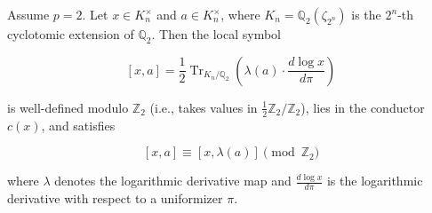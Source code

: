 Assume $p = 2$. Let $x \in K_n^{\times}$ and $a \in K_n^{\times}$, where $K_n = \mathbb{Q}_2(\zeta_{2^n})$ is the $2^n$-th cyclotomic extension of $\mathbb{Q}_2$. Then the local symbol

$$[x, a] = \frac{1}{2} \operatorname{Tr}_{K_n/\mathbb{Q}_2}\left( \lambda(a) \cdot \frac{d\log x}{d\pi} \right)$$

is well-defined modulo $\mathbb{Z}_2$ (i.e., takes values in $\frac{1}{2}\mathbb{Z}_2/\mathbb{Z}_2$), lies in the conductor $c(x)$, and satisfies

$$[x, a] \equiv [x, \lambda(a)] \pmod{\mathbb{Z}_2}$$

where $\lambda$ denotes the logarithmic derivative map and $\frac{d\log x}{d\pi}$ is the logarithmic derivative with respect to a uniformizer $\pi$.
